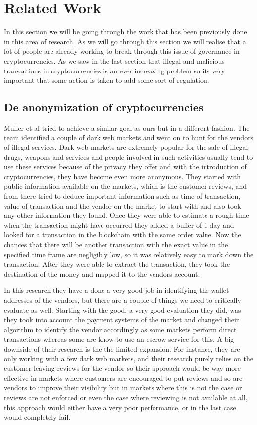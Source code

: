 \documentclass{article}
\begin{document}
\cite{kethineni_cao_2019}
\pagebreak
\section{Related Work}
In this section we will be going through the work that has been previously done in this area of research. As we will go through this section we will realise that a lot of people are already working to break through this issue of governance in cryptocurrencies. As we saw in the last section that illegal and malicious transactions in cryptocurrencies is an ever increasing problem so its very important that some action is taken to add some sort of regulation.

\subsection{De anonymization of cryptocurrencies}
Muller et al \cite{muller} tried to achieve a similar goal as ours but in a different fashion. The team identified a couple of dark web markets and went on to hunt for the vendors of illegal services. Dark web markets are extremely popular for the sale of illegal drugs, weapons and services and people involved in such activities usually tend to use these services because of the privacy they offer and with the introduction of cryptocurrencies, they have become even more anonymous. They started with public information available on the markets, which is the customer reviews, and from there tried to deduce important information such as time of transaction, value of transaction and the vendor on the market to start with and also took any other information they found. Once they were able to estimate a rough time when the transaction might have occurred they added a buffer of 1 day and looked for a transaction in the blockchain with the same order value. Now the chances that there will be another transaction with the exact value in the specified time frame are negligibly low, so it was relatively easy to mark down the transaction. After they were able to extract the transaction, they took the destination of the money and mapped it to the vendors account.

In this research they have a done a very good job in identifying the wallet addresses of the vendors, but there are a couple of things we need to critically evaluate as well. Starting with the good, a very good evaluation they did, was they took into account the payment systems of the market and changed their algorithm to identify the vendor accordingly as some markets perform direct transactions whereas some are know to use an escrow service \cite{Fig} for this. A big downside of their research is the the limited expansion. For instance, they are only working with a few dark web markets, and their research purely relies on the customer leaving reviews for the vendor so their approach would be way more effective in markets where customers are encouraged to put reviews and so are vendors to improve their visibility but in markets where this is not the case or reviews are not enforced or even the case where reviewing is not available at all, this approach would either have a very poor performance, or in the last case would completely fail. 
\end{document}
